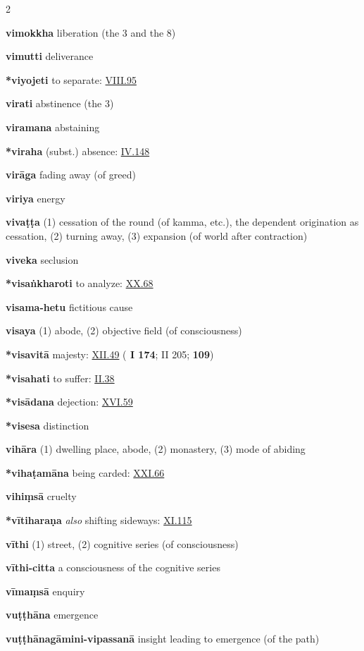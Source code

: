 \begin{multicols}{2}
\begin{vismHanging}
\par\textbf{vimokkha} liberation (the 3 and the 8)
\par\textbf{vimutti} deliverance
\par\textbf{*viyojeti} to separate: \hyperlink{VIII.95}{VIII.95}{} 
\par\textbf{virati} abstinence (the 3) 
\par\textbf{viramana} abstaining
\par\textbf{*viraha} (subst.) absence: \hyperlink{IV.148}{IV.148}{}
\par\textbf{virāga} fading away (of greed)
\par\textbf{viriya} energy
\par\textbf{vivaṭṭa} (1) cessation of the round (of kamma, etc.), the dependent origination as cessation, (2) turning away, (3) expansion (of world after contraction) 
\par\textbf{viveka} seclusion
\par\textbf{*visaṅkharoti} to analyze: \hyperlink{XX.68}{XX.68}{}
\par\textbf{visama-hetu} fictitious cause
\par\textbf{visaya} (1) abode, (2) objective field (of consciousness) 
\par\textbf{*visavitā} majesty: \hyperlink{XII.49}{XII.49}{} (\textbf{\cite{Paṭis} I 174}; II 205; \textbf{\cite{Dhs-a} 109}) 
\par\textbf{*visahati} to suffer: \hyperlink{II.38}{II.38}{}
\par\textbf{*visādana} dejection: \hyperlink{XVI.59}{XVI.59}{}
\par\textbf{*visesa} distinction
\par\textbf{vihāra} (1) dwelling place, abode, (2) monastery, (3) mode of abiding
\par\textbf{*vihaṭamāna} being carded: \hyperlink{XXI.66}{XXI.66}{}
\par\textbf{vihiṃsā} cruelty
\par\textbf{*vītiharaṇa} \emph{also }shifting sideways: \hyperlink{XI.115}{XI.115}{}
\par\textbf{vīthi} (1) street, (2) cognitive series (of consciousness) 
\par\textbf{vīthi-citta} a consciousness of the cognitive series 
\par\textbf{vīmaṃsā} enquiry
\par\textbf{vuṭṭhāna} emergence
\par\textbf{vuṭṭhānagāmini-vipassanā} insight leading to emergence (of the path) 

\end{vismHanging}
\end{multicols}
